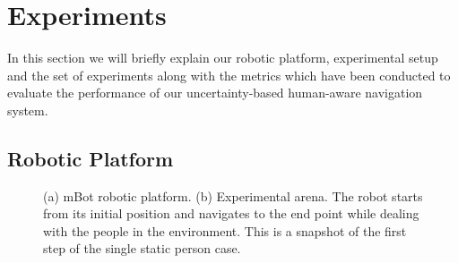 \section{Experiments}
\label{sec:experimental_setup}
In this section we will briefly explain our robotic platform, experimental setup and the set of experiments along with the metrics which have been conducted to evaluate the performance of our uncertainty-based human-aware navigation system.

\subsection{Robotic Platform}
\label{sec:robot}

\begin{figure}[t!]
\centering
{}%
\hspace{0.1cm}
%
\hspace{0.1cm}

\caption{(a) mBot robotic platform. (b) Experimental arena. The robot starts from its initial position and navigates to the end point while dealing with the people in the environment. This is a snapshot of the first step of the single static person case.}
\label{fig:setup}
\end{figure}




